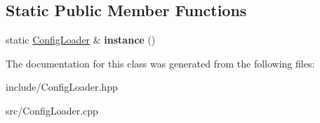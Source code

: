 \subsection*{Static Public Member Functions}
\begin{DoxyCompactItemize}
\item 
\hypertarget{class_config_loader_a24a649e36f7aac63683bfa52c2a1d1dd}{static \hyperlink{class_config_loader}{Config\-Loader} \& {\bfseries instance} ()}\label{class_config_loader_a24a649e36f7aac63683bfa52c2a1d1dd}

\end{DoxyCompactItemize}


The documentation for this class was generated from the following files\-:\begin{DoxyCompactItemize}
\item 
include/Config\-Loader.\-hpp\item 
src/Config\-Loader.\-cpp\end{DoxyCompactItemize}
